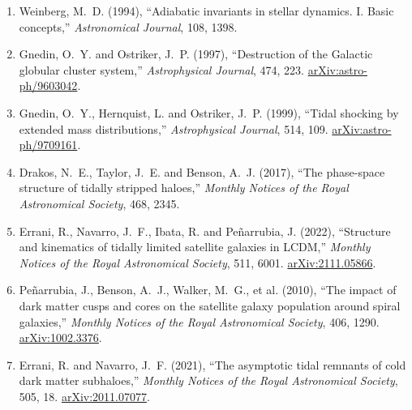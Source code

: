 \documentclass[11pt,a4paper]{article}
\begin{document}
\begin{enumerate}[leftmargin=*]
\item Weinberg, M.~D. (1994),
``Adiabatic invariants in stellar dynamics. I. Basic concepts,''
\emph{Astronomical Journal}, 108, 1398.

\item Gnedin, O.~Y. and Ostriker, J.~P. (1997),
``Destruction of the Galactic globular cluster system,''
\emph{Astrophysical Journal}, 474, 223.
\href{https://arxiv.org/abs/astro-ph/9603042}{arXiv:astro-ph/9603042}.

\item Gnedin, O.~Y., Hernquist, L. and Ostriker, J.~P. (1999),
``Tidal shocking by extended mass distributions,''
\emph{Astrophysical Journal}, 514, 109.
\href{https://arxiv.org/abs/astro-ph/9709161}{arXiv:astro-ph/9709161}.

\item Drakos, N.~E., Taylor, J.~E. and Benson, A.~J. (2017),
``The phase-space structure of tidally stripped haloes,''
\emph{Monthly Notices of the Royal Astronomical Society}, 468, 2345.

\item Errani, R., Navarro, J.~F., Ibata, R. and Pe\~narrubia, J. (2022),
``Structure and kinematics of tidally limited satellite galaxies in LCDM,''
\emph{Monthly Notices of the Royal Astronomical Society}, 511, 6001.
\href{https://arxiv.org/abs/2111.05866}{arXiv:2111.05866}.

\item Pe\~narrubia, J., Benson, A.~J., Walker, M.~G., et al. (2010),
``The impact of dark matter cusps and cores on the satellite galaxy population around spiral galaxies,''
\emph{Monthly Notices of the Royal Astronomical Society}, 406, 1290.
\href{https://arxiv.org/abs/1002.3376}{arXiv:1002.3376}.

\item Errani, R. and Navarro, J.~F. (2021),
``The asymptotic tidal remnants of cold dark matter subhaloes,''
\emph{Monthly Notices of the Royal Astronomical Society}, 505, 18.
\href{https://arxiv.org/abs/2011.07077}{arXiv:2011.07077}.

\end{enumerate}
\end{document}
